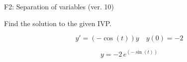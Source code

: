 \begin{exercise}
  \begin{exerciseTitle}F2: Separation of variables (ver. 10)\end{exerciseTitle}
  \begin{exerciseStatement}
    
Find the solution to the given IVP.

    
\[y'=( -\cos\left(t\right) )y\hspace{1em} y(0)= -2\]

  \end{exerciseStatement}
  \begin{exerciseAnswer}
    
\[y= -2 \, e^{\left(-\sin\left(t\right)\right)}\]

  \end{exerciseAnswer}
\end{exercise}